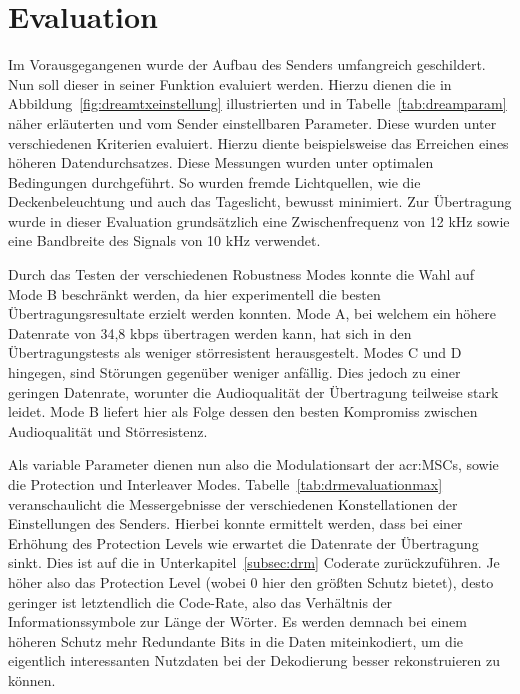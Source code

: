 
\chapter{Evaluation}
\label{sec:evaluation}
Im Vorausgegangenen wurde der Aufbau des Senders umfangreich geschildert. Nun soll dieser in seiner Funktion evaluiert werden. Hierzu dienen die in Abbildung~\ref{fig:dreamtxeinstellung} illustrierten und in Tabelle~\ref{tab:dreamparam} näher erläuterten und vom Sender einstellbaren Parameter. Diese wurden unter verschiedenen Kriterien evaluiert. Hierzu diente beispielsweise das Erreichen eines höheren Datendurchsatzes. Diese Messungen wurden unter optimalen Bedingungen durchgeführt. So wurden fremde Lichtquellen, wie die Deckenbeleuchtung und auch das Tageslicht, bewusst minimiert. Zur Übertragung wurde in dieser Evaluation grundsätzlich eine Zwischenfrequenz von 12 kHz sowie eine Bandbreite des Signals von 10 kHz verwendet.

Durch das Testen der verschiedenen Robustness Modes konnte die Wahl auf Mode B beschränkt werden, da hier experimentell die besten Übertragungsresultate erzielt werden konnten. Mode A, bei welchem ein höhere Datenrate von 34,8 kbps übertragen werden kann, hat sich in den Übertragungstests als weniger störresistent herausgestelt. Modes C und D hingegen, sind Störungen gegenüber weniger anfällig. Dies jedoch zu einer geringen Datenrate, worunter die Audioqualität der Übertragung teilweise stark leidet. Mode B liefert hier als Folge dessen den besten Kompromiss zwischen Audioqualität und Störresistenz.

Als variable Parameter dienen nun also die Modulationsart der \gls{acr:MSC}s, sowie die Protection und Interleaver Modes. Tabelle~\ref{tab:drmevaluationmax} veranschaulicht die Messergebnisse der verschiedenen Konstellationen der Einstellungen des Senders. Hierbei konnte ermittelt werden, dass bei einer Erhöhung des Protection Levels wie erwartet die Datenrate der Übertragung sinkt. Dies ist auf die in Unterkapitel~\ref{subsec:drm} Coderate zurückzuführen. Je höher also das Protection Level (wobei 0 hier den größten Schutz bietet), desto geringer ist letztendlich die Code-Rate, also das Verhältnis der Informationssymbole zur Länge der Wörter. Es werden demnach bei einem höheren Schutz mehr Redundante Bits in die Daten miteinkodiert, um die eigentlich interessanten Nutzdaten bei der Dekodierung besser rekonstruieren zu können. 



